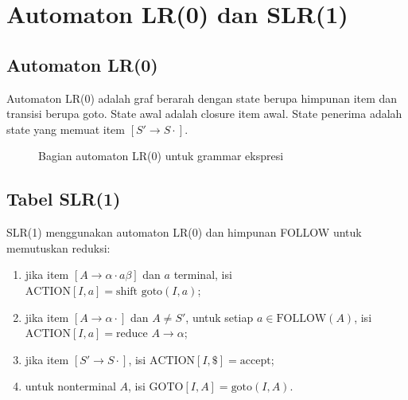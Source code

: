 \section{Automaton LR(0) dan SLR(1)}
\label{sec:ch12-slr}

\subsection{Automaton LR(0)}

Automaton LR(0) adalah graf berarah dengan state berupa himpunan
item dan transisi berupa goto. State awal adalah closure item awal.
State penerima adalah state yang memuat item \([S' \to S \cdot]\).

\begin{figure}[H]
\centering
{}
\caption{Bagian automaton LR(0) untuk grammar ekspresi}
\label{fig:ch12-automaton}
\end{figure}

\subsection{Tabel SLR(1)}

SLR(1) menggunakan automaton LR(0) dan himpunan FOLLOW untuk
memutuskan reduksi:
\begin{enumerate}[label=\arabic*.,leftmargin=*]
  \item jika item \([A \to \alpha \cdot a \beta]\) dan \(a\) terminal,
        isi \(\text{ACTION}[I,a] = \text{shift goto}(I,a)\);
  \item jika item \([A \to \alpha \cdot]\) dan \(A \neq S'\), untuk
        setiap \(a \in \text{FOLLOW}(A)\), isi
        \(\text{ACTION}[I,a] = \text{reduce } A \to \alpha\);
  \item jika item \([S' \to S \cdot]\), isi
        \(\text{ACTION}[I,\$] = \text{accept}\);
  \item untuk nonterminal \(A\), isi
        \(\text{GOTO}[I,A] = \text{goto}(I,A)\).
\end{enumerate}

